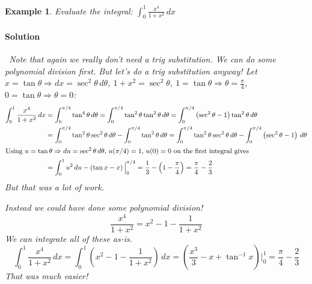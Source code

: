 \documentclass[letterpaper, 11pt, openany]{book}
\theoremstyle{mytheoremstyle}
\theoremstyle{myexamplestyle}
\newtheorem{example}{Example}[section]
\newenvironment{solution}{\paragraph{\sffamily \smaller \fontseries{b}\selectfont Solution}}{\hfill\faSquare}
\begin{document}
\begin{example}\label{e:trigsubdiv}
    Evaluate the integral: $\displaystyle \int_{0}^{1} \frac{x^{4}}{1+x^{2}} \, dx$
    
    \begin{solution}
        \faExclamationTriangle[solid] \ Note that again we really don't need a trig substitution. We can do some polynomial division first. But let's do a trig substitution anyway! Let $x = \tan \theta \Rightarrow dx = \sec^{2}\theta \, d\theta$, $1 + x^{2} = \sec^{2} \theta$, $1 = \tan \theta \Rightarrow \theta = \frac{\pi}{4}$, $0 = \tan \theta \Rightarrow \theta = 0$:
        \begin{align*}
            \int_{0}^{1} \frac{x^{4}}{1+x^{2}} \, dx &= \int_{0}^{\pi/4} \tan^{4} \theta \, d\theta = \int_{0}^{\pi/4} \tan^{2} \theta \tan^{2} \theta \, d\theta = \int_{0}^{\pi/4} \left( \sec^{2} \theta - 1 \right) \tan^{2} \theta \, d\theta \\
            &= \int_{0}^{\pi/4} \tan^{2} \theta \sec^{2} \theta\, d\theta  - \int_{0}^{\pi/4} \tan^{2} \theta \, d\theta = \int_{0}^{\pi/4} \tan^{2} \theta \sec^{2} \theta\, d\theta - \int_{0}^{\pi/4} \left( \sec^{2}\theta - 1 \right)\, d\theta \\
            \intertext{Using $u = \tan \theta \Rightarrow du = \sec^{2}\theta \, d\theta$, $u(\pi/4) = 1$, $u(0)= 0$ on the first integral gives}
            &= \int_{0}^{1} u^{2} \, du - \left( \tan x - x \right)\Big|_{0}^{\pi/4}  = \frac{1}{3} - \left( 1 - \frac{\pi}{4} \right) = \frac{\pi}{4} - \frac{2}{3}
        \end{align*}
        But that was a lot of work. \faMeh
    
        Instead we could have done some polynomial division!
        \[\frac{x^{4}}{1 + x^{2}} = x^{2} - 1 - \frac{1}{1+x^{2}}  \]
        We can integrate all of these as-is.
        \[\int_{0}^{1} \frac{x^{4}}{1+x^{2}} \, dx = \int_{0}^{1} \left( x^{2} - 1 - \frac{1}{1+x^{2}} \right) \, dx = \left( \frac{x^{3}}{3}  - x + \tan^{-1}x \right)\Bigg|_{0}^{1} = \frac{\pi}{4} - \frac{2}{3}\]
        That was much easier! \faSmile
    \end{solution}
    
\end{example}
\end{document}

